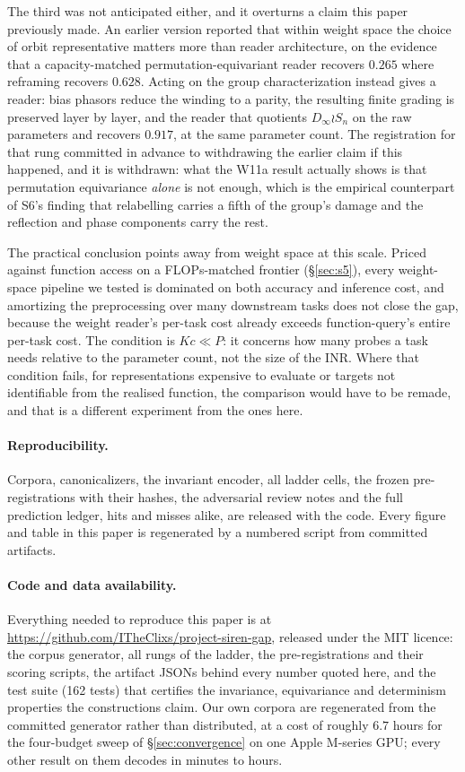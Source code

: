 \documentclass[10pt,twocolumn,letterpaper]{article}
\theoremstyle{definition}
\newcommand{\Dinf}{D_\infty}
\begin{document}
The third was not anticipated either, and it overturns a claim this paper previously made. An
earlier version reported that within weight space the choice of orbit representative matters more
than reader architecture, on the evidence that a capacity-matched permutation-equivariant reader
recovers $0.265$ where reframing recovers $0.628$. Acting on the group characterization instead gives a reader: bias phasors reduce the winding to a parity, the resulting finite grading is preserved layer by layer, and the reader that quotients $\Dinf\wr S_n$ on the raw parameters and recovers
$\mathbf{0.917}$, at the same parameter count. The registration for that rung committed in advance
to withdrawing the earlier claim if this happened, and it is withdrawn: what the W11a result
actually shows is that permutation equivariance \emph{alone} is not enough, which is the
empirical counterpart of S6's finding that relabelling carries a fifth of the group's damage and
the reflection and phase components carry the rest.

The practical conclusion points away from weight space at this scale. Priced against function
access on a FLOPs-matched frontier (\S\ref{sec:s5}), every weight-space pipeline we tested is
dominated on both accuracy and inference cost, and amortizing the preprocessing over many
downstream tasks does not close the gap, because the weight reader's per-task cost already exceeds
function-query's entire per-task cost. The condition is $Kc \ll P$: it concerns how many probes a
task needs relative to the parameter count, not the size of the INR. Where that condition fails, for representations expensive to evaluate or targets not identifiable from the realised function, the comparison would have to be remade, and that is a different experiment from the ones here.

\paragraph{Reproducibility.} Corpora, canonicalizers, the invariant encoder, all ladder cells, the
frozen pre-registrations with their hashes, the adversarial review notes and the full prediction ledger, hits and misses alike, are released with the code. Every figure and table in this paper is
regenerated by a numbered script from committed artifacts.

\paragraph{Code and data availability.} Everything needed to reproduce this paper is at
\url{https://github.com/ITheClixs/project-siren-gap}, released under the MIT licence: the corpus
generator, all rungs of the ladder, the pre-registrations and their scoring scripts, the artifact
JSONs behind every number quoted here, and the test suite (162 tests) that certifies the
invariance, equivariance and determinism properties the constructions claim. Our own corpora are
regenerated from the committed generator rather than distributed, at a cost of roughly $6.7$ hours
for the four-budget sweep of \S\ref{sec:convergence} on one Apple M-series GPU; every other result
on them decodes in minutes to hours.
\end{document}
